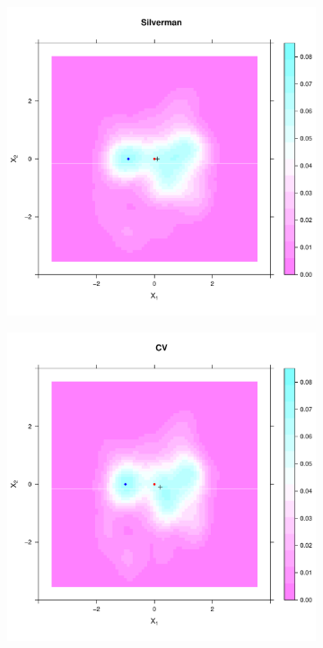 \begin{figure}[htbp]
    \begin{subfigure}[b]{0.45\textwidth}
        \includegraphics[width=\textwidth]{output/silverman_intensity_heatmap}
        \label{fig:cases_heatmap:unif_100_1.0_1h:silverman}
    \end{subfigure}%
    \begin{subfigure}[b]{0.45\textwidth}
        \includegraphics[width=\textwidth]{output/CV_intensity_heatmap}

\end{subfigure}
\end{figure}

